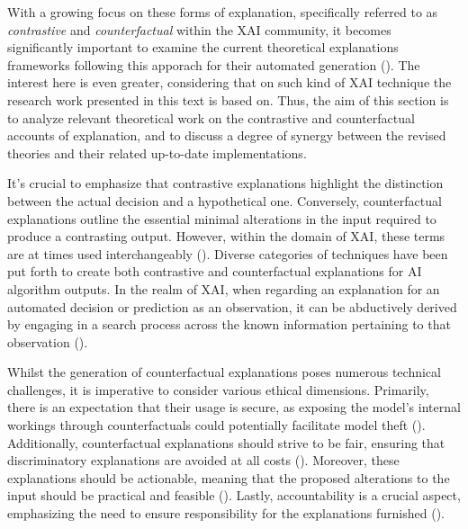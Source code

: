 \documentclass[binding=0.6cm]{sapthesis}
\newcommand{\mycite}[1]{(\cite{#1})}
\begin{document}
With a growing focus on these forms of explanation, specifically referred to as \textit{contrastive} and \textit{counterfactual} within the XAI community, it becomes significantly important to examine the current theoretical explanations frameworks following this apporach for their automated generation \mycite{stepin2021-xai-cf-contrative-survey}. The interest here is even greater, considering that on such kind of XAI technique the research work presented in this text is based on. Thus, the aim of this section is to analyze relevant theoretical work on the contrastive and counterfactual accounts of explanation, and to discuss a degree of synergy between the revised theories and their related up-to-date implementations.

It's crucial to emphasize that contrastive explanations highlight the distinction between the actual decision and a hypothetical one. Conversely, counterfactual explanations outline the essential minimal alterations in the input required to produce a contrasting output. However, within the domain of XAI, these terms are at times used interchangeably \mycite{thai2020-grace,poyiadzi2020-face}. Diverse categories of techniques have been put forth to create both contrastive and counterfactual explanations for AI algorithm outputs. In the realm of XAI, when regarding an explanation for an automated decision or prediction as an observation, it can be abductively derived by engaging in a search process across the known information pertaining to that observation \mycite{bergadano2000-abduction}.

Whilst the generation of counterfactual explanations poses numerous technical challenges, it is imperative to consider various ethical dimensions. Primarily, there is an expectation that their usage is secure, as exposing the model's internal workings through counterfactuals could potentially facilitate model theft \mycite{sokol2019-counterfactualEO}. Additionally, counterfactual explanations should strive to be fair, ensuring that discriminatory explanations are avoided at all costs \mycite{kusner2018-counterfactual}. Moreover, these explanations should be actionable, meaning that the proposed alterations to the input should be practical and feasible \mycite{lucic2020-model-fail}. Lastly, accountability is a crucial aspect, emphasizing the need to ensure responsibility for the explanations furnished \mycite{arrieta2020-taxo-xai}.
\end{document}
